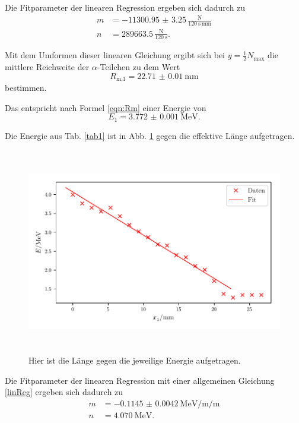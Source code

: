 \noindent Die Fitparameter der linearen Regression ergeben sich dadurch zu 
\begin{align*}
    m &= - \num{11300.95(325)} \,\frac{\text{N}}{\SI{120}{\second}\, \si{\milli\meter}} \\
    n &= \num{289663.5} \, \frac{\text{N}}{\SI{120}{\second}} .
\end{align*}


\noindent Mit dem Umformen dieser linearen Gleichung ergibt sich bei $y = \frac{1}{2} N_\text{max}$ die mittlere Reichweite der $\alpha$-Teilchen zu dem Wert %
\begin{equation*}
    R_\text{m,1} = \SI{22.71(1)}{\milli\meter}
\end{equation*}
bestimmen.

\noindent Das entspricht nach Formel \eqref{eqn:Rm} einer Energie von %
\begin{equation*}
    E_1 = \SI{3.772(1)}{\mega\electronvolt}.
\end{equation*}

\noindent Die Energie aus Tab. \ref{tab1} ist in Abb. \ref{fig:energie1} gegen die effektive Länge aufgetragen.
\begin{figure}
    \centering
    \includegraphics[width=15cm, height=9cm]{build/plotb.pdf}
    \caption{Hier ist die Länge gegen die jeweilige Energie aufgetragen.}
    \label{fig:energie1}
\end{figure}

\noindent Die Fitparameter der linearen Regression mit einer allgemeinen Gleichung \eqref{linReg} ergeben sich dadurch zu 
\begin{align*}
    m &= - \SI{0.1145(42)}{\mega\electronvolt\per\milli\per\meter} \\
    n &= \SI{4.070}{\mega\electronvolt} .
\end{align*}

